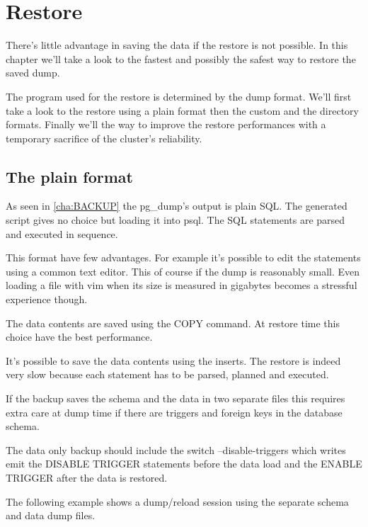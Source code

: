 \chapter{Restore}
\label{cha:RESTORE}
There's little advantage in saving the data if the restore is not possible. In this chapter we'll take a
look to the fastest and possibly the safest way to restore the saved dump.\newline

The program used for the restore is determined by the dump format. We'll first take a look to the restore
using a plain format then the custom and  the directory formats. Finally we'll the way to improve
the restore performances with a temporary sacrifice of the cluster's reliability.

\section{The plain format}
\label{sec:PLAINFORMAT}
As seen in \ref{cha:BACKUP} the pg\_dump's output is plain SQL. The generated script gives no choice but
loading it into psql. The SQL statements are parsed and executed in sequence.\newline

This format have few advantages. For example it's possible to edit the statements using a common
text editor. This of course if the dump is reasonably small. Even loading a file with vim when its size is
measured in gigabytes becomes a stressful experience though.\newline

The data contents are saved using the COPY command. At restore time this choice have the best performance.

It's possible to save the data contents using the inserts. The restore is indeed very slow because each
statement has to be parsed, planned and executed.\newline

If the backup saves the schema and the data in two separate files this requires extra care at dump time if
there are triggers and foreign keys in the database schema.

The data only backup should include the switch --disable-triggers which writes emit the DISABLE
TRIGGER statements before the data load and the ENABLE TRIGGER after the data is restored.\newline

The following example shows a dump/reload session using the separate schema and data dump files.

